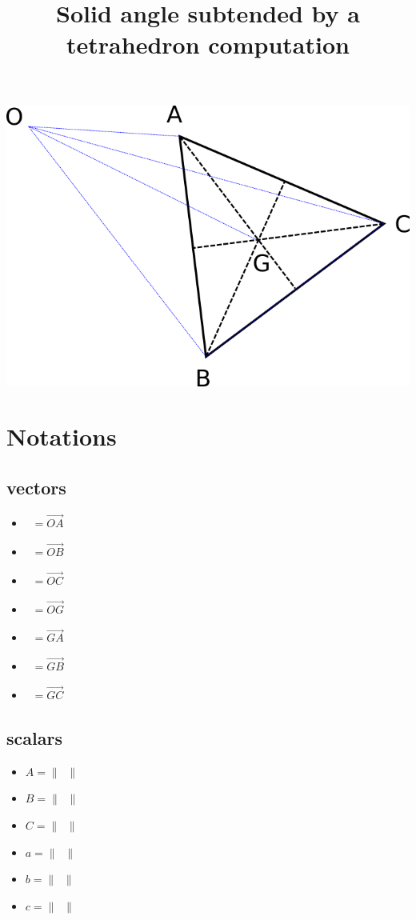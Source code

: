 \documentclass[10pt,a4paper]{article}
\title{Solid angle subtended by a tetrahedron computation}
\newcommand{\ud}[1]{\underline{#1}}
\DeclareMathOperator{\A}{\ud{A}}
\DeclareMathOperator{\B}{\ud{B}}
\DeclareMathOperator{\C}{\ud{C}}
\DeclareMathOperator{\G}{\ud{G}}
\DeclareMathOperator{\av}{\ud{a}}
\DeclareMathOperator{\bv}{\ud{b}}
\DeclareMathOperator{\cv}{\ud{c}}
\begin{document}
\maketitle


\includegraphics[scale=0.4]{tetra.png} 


\section{Notations}

\subsection{vectors}

\begin{itemize}
	\item $\A=\vec{OA}$
	\item $\B=\vec{OB}$
	\item $\C=\vec{OC}$
	\item $\G=\vec{OG}$
	\item $\av=\vec{GA}$
	\item $\bv=\vec{GB}$
    \item $\cv=\vec{GC}$
\end{itemize}

\subsection{scalars}

\begin{itemize}
	\item $A = \|\A\|$
	\item $B = \|\B\|$
	\item $C = \|\C\|$
	\item $a = \|\av\|$
	\item $b = \|\bv\|$
	\item $c = \|\cv\|$
\end{itemize}
\end{document}
